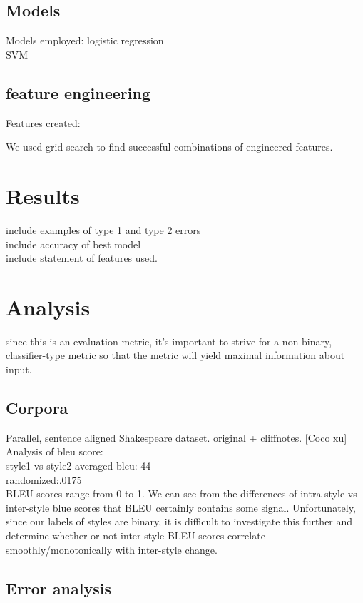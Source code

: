 \documentclass[letterpaper, 10 pt, conference]{ieeeconf}  %
\begin{document}
\subsection{Models}
Models employed:
logistic regression\\
SVM




\subsection{feature engineering}
Features created:


We used grid search to find successful combinations of engineered features.
  
\section{Results}
  include examples of type 1 and type 2 errors\\
  include accuracy of best model\\
  include statement of features used.\\
\section{Analysis}
  since this is an evaluation metric, it's important to strive for a non-binary, classifier-type metric so that the metric will yield maximal information about input.
  \subsection{Corpora}
    Parallel, sentence aligned Shakespeare dataset. original + cliffnotes. [Coco xu]
    Analysis of bleu score:\\

    style1 vs style2 averaged bleu: 44 \\
randomized:.0175 \\

  BLEU scores range from 0 to 1. We can see from the differences of intra-style vs inter-style blue scores that BLEU certainly contains some signal. Unfortunately, since our labels of styles are binary, it is difficult to investigate this further and determine whether or not inter-style BLEU scores correlate smoothly/monotonically with inter-style change.

  \subsection{Error analysis}
\end{document}
